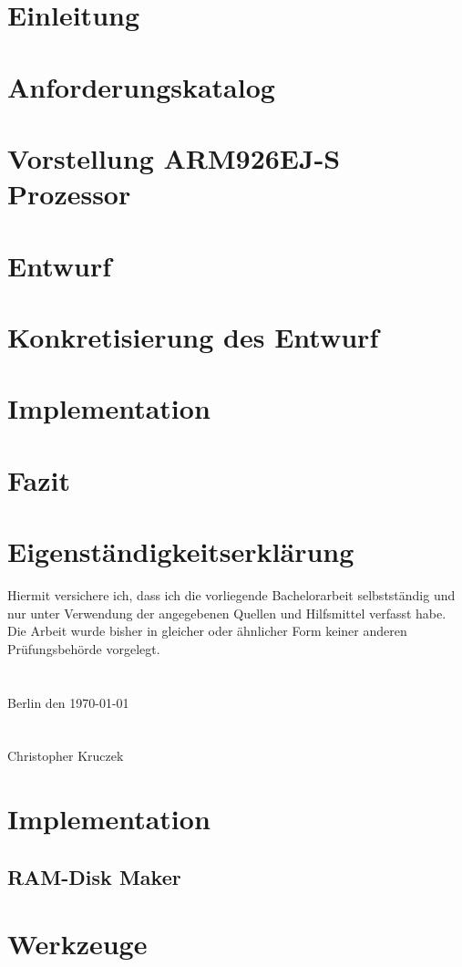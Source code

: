\documentclass[fontsize=12pt,paper=A4,pagesize,DIV=calc,BCOR=1cm]{scrreprt}
\begin{document}
\onehalfspacing


\newpage
\thispagestyle{empty}
\mbox{}

\tableofcontents
{}
\listoftables
\listoffigures
\lstlistoflistings
{}
\chapter{Einleitung}

\chapter{Anforderungskatalog}

\chapter{Vorstellung ARM926EJ-S Prozessor}

\chapter{Entwurf}

\chapter{Konkretisierung des Entwurf}

\chapter{Implementation}

\chapter{Fazit}

\chapter{Eigenst\"andigkeitserkl\"arung}
Hiermit versichere ich, dass ich die vorliegende Bachelorarbeit selbstst\"andig und nur unter 
Verwendung der angegebenen Quellen und Hilfsmittel verfasst habe. Die Arbeit wurde bisher 
in gleicher oder \"ahnlicher Form keiner anderen Pr\"ufungsbeh\"orde vorgelegt.\\\\\\
Berlin den \today \\\\\\
Christopher Kruczek
\printbibliography[heading=bibintoc]

\appendix
{}
\chapter{Implementation}
\section{RAM-Disk Maker}

\chapter{Werkzeuge}

\end{document}
